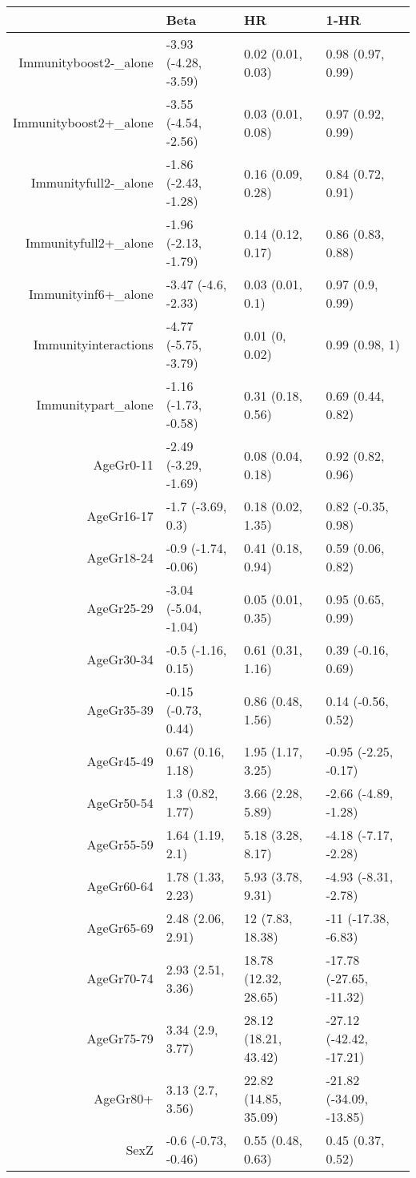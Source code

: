 \begin{table}[ht]
\centering
\begin{tabular}{rlll}
  \hline
 & Beta & HR & 1-HR \\ 
  \hline
Immunityboost2-\_alone & -3.93 (-4.28, -3.59) & 0.02 (0.01, 0.03) & 0.98 (0.97, 0.99) \\ 
  Immunityboost2+\_alone & -3.55 (-4.54, -2.56) & 0.03 (0.01, 0.08) & 0.97 (0.92, 0.99) \\ 
  Immunityfull2-\_alone & -1.86 (-2.43, -1.28) & 0.16 (0.09, 0.28) & 0.84 (0.72, 0.91) \\ 
  Immunityfull2+\_alone & -1.96 (-2.13, -1.79) & 0.14 (0.12, 0.17) & 0.86 (0.83, 0.88) \\ 
  Immunityinf6+\_alone & -3.47 (-4.6, -2.33) & 0.03 (0.01, 0.1) & 0.97 (0.9, 0.99) \\ 
  Immunityinteractions & -4.77 (-5.75, -3.79) & 0.01 (0, 0.02) & 0.99 (0.98, 1) \\ 
  Immunitypart\_alone & -1.16 (-1.73, -0.58) & 0.31 (0.18, 0.56) & 0.69 (0.44, 0.82) \\ 
  AgeGr0-11 & -2.49 (-3.29, -1.69) & 0.08 (0.04, 0.18) & 0.92 (0.82, 0.96) \\ 
  AgeGr16-17 & -1.7 (-3.69, 0.3) & 0.18 (0.02, 1.35) & 0.82 (-0.35, 0.98) \\ 
  AgeGr18-24 & -0.9 (-1.74, -0.06) & 0.41 (0.18, 0.94) & 0.59 (0.06, 0.82) \\ 
  AgeGr25-29 & -3.04 (-5.04, -1.04) & 0.05 (0.01, 0.35) & 0.95 (0.65, 0.99) \\ 
  AgeGr30-34 & -0.5 (-1.16, 0.15) & 0.61 (0.31, 1.16) & 0.39 (-0.16, 0.69) \\ 
  AgeGr35-39 & -0.15 (-0.73, 0.44) & 0.86 (0.48, 1.56) & 0.14 (-0.56, 0.52) \\ 
  AgeGr45-49 & 0.67 (0.16, 1.18) & 1.95 (1.17, 3.25) & -0.95 (-2.25, -0.17) \\ 
  AgeGr50-54 & 1.3 (0.82, 1.77) & 3.66 (2.28, 5.89) & -2.66 (-4.89, -1.28) \\ 
  AgeGr55-59 & 1.64 (1.19, 2.1) & 5.18 (3.28, 8.17) & -4.18 (-7.17, -2.28) \\ 
  AgeGr60-64 & 1.78 (1.33, 2.23) & 5.93 (3.78, 9.31) & -4.93 (-8.31, -2.78) \\ 
  AgeGr65-69 & 2.48 (2.06, 2.91) & 12 (7.83, 18.38) & -11 (-17.38, -6.83) \\ 
  AgeGr70-74 & 2.93 (2.51, 3.36) & 18.78 (12.32, 28.65) & -17.78 (-27.65, -11.32) \\ 
  AgeGr75-79 & 3.34 (2.9, 3.77) & 28.12 (18.21, 43.42) & -27.12 (-42.42, -17.21) \\ 
  AgeGr80+ & 3.13 (2.7, 3.56) & 22.82 (14.85, 35.09) & -21.82 (-34.09, -13.85) \\ 
  SexZ & -0.6 (-0.73, -0.46) & 0.55 (0.48, 0.63) & 0.45 (0.37, 0.52) \\ 
   \hline
\end{tabular}
\end{table}

